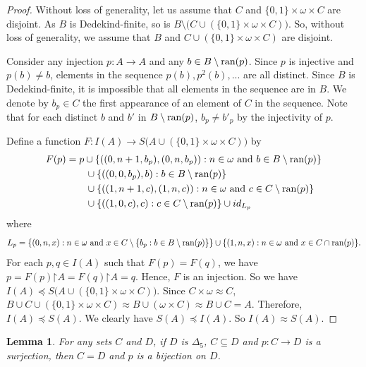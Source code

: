 \documentclass[a4paper,12pt,review]{article} %
\newtheorem{lem}[thm]{Lemma}
\theoremstyle{definition}
\numberwithin{equation}{section}
\newcommand{\ran}{\textup{ran}}
\renewcommand{\restriction}{\mathord{\upharpoonright}}
\begin{document}
\begin{proof}
Without loss of generality, let us assume that $C$ and $\{0,1\}\times\omega\times C$ are disjoint. As $B$ is Dedekind-finite, so is $B\setminus \bigl(C\cup (\{0,1\}\times\omega\times C)\bigr)$. So, without loss of generality, we assume that $B$ and $C\cup (\{0,1\}\times\omega\times C)$ are disjoint.

Consider any injection $p:A\to A$ and any $b\in B\setminus \ran(p)$. Since $p$ is injective and $p(b)\neq b$, elements in the sequence $p(b),p^{2}(b),...$ are all distinct. Since $B$ is Dedekind-finite, it is impossible that all elements in the sequence are in $B$. We denote by $b_{p}\in C$ the first appearance of an element of $C$ in the sequence. Note that for each distinct $b$ and $b'$ in $B\setminus \ran(p)$, $b_{p}\neq b'_{p}$ by the injectivity of $p$. 

Define a function $F:I(A)\to S\bigl(A\cup (\{0,1\}\times\omega\times C)\bigr)$ by 
\begin{align*}
F(p) &= p\cup \{((0,n+1,b_{p}),(0,n,b_{p})):n\in\omega\text{ and }b\in B\setminus \ran(p)\} \\
& \hspace{2em} \cup\{((0,0,b_{p}),b):b\in B\setminus \ran(p)\} \\
& \hspace{2em} \cup \{((1,n+1,c),(1,n,c)):n\in\omega\text{ and }c\in C\setminus \ran(p)\} \\
& \hspace{2em} \cup\{((1,0,c),c):c\in C\setminus \ran(p)\} \cup id_{L_p}
\end{align*}
where 
\begin{equation*}
L_p=\{(0,n,x):n\in\omega\text{ and } x\in C\setminus\{b_{p}:b\in B\setminus \ran(p)\}\} \cup \{(1,n,x):n\in\omega\text{ and } x\in C\cap\ran(p)\}.
\end{equation*}
For each $p,q\in I(A)$ such that $F(p)=F(q)$, we have $p=F(p)\restriction A =F(q)\restriction A=q$. Hence, $F$ is an injection. So we have $I(A)\preceq S\bigl(A\cup (\{0,1\}\times\omega\times C)\bigr)$. Since $C\times\omega\approx C$, $B\cup C\cup (\{0,1\}\times\omega\times C)\approx B\cup(\omega\times C)\approx B\cup C=A$. Therefore, $I(A)\preceq S(A)$. We clearly have $S(A)\preceq I(A)$. So $I(A)\approx S(A)$.
\end{proof}


\begin{lem}\label{lem1}
    For any sets $C$ and $D$, if $D$ is $\Delta_{5}$, $C\subseteq D$ and $p:C\to D$ is a surjection, then $C=D$ and $p$ is a bijection on $D$.
\end{lem}
\end{document}
